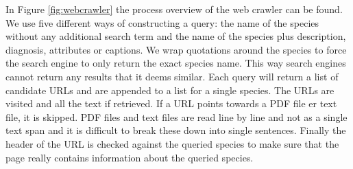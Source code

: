\documentclass[a4paper, 12pt, oneside]{book} %
\begin{document}
In Figure \ref{fig:webcrawler} the process overview of the web crawler can be found.
We use five different ways of constructing a query: the name of the species without any additional search term and the name of the species plus description, diagnosis, attributes or captions.
We wrap quotations around the species to force the search engine to only return the exact species name. 
This way search engines cannot return any results that it deems similar.
Each query will return a list of candidate URLs and are appended to a list for a single species.
The URLs are visited and all the text if retrieved.
If a URL points towards a PDF file er text file, it is skipped.
PDF files and text files are read line by line and not as a single text span and it is difficult to break these down into single sentences. 
Finally the header of the URL is checked against the queried species to make sure that the page really contains information about the queried species.
\end{document}
